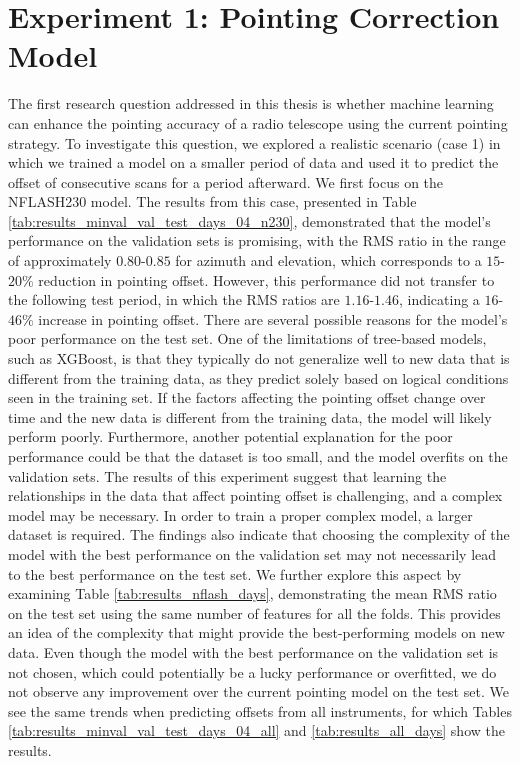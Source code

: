 \section{Experiment 1: Pointing Correction Model}
The first research question addressed in this thesis is whether machine learning can enhance the pointing accuracy of a radio telescope using the current pointing strategy.
To investigate this question, we explored a realistic scenario (case 1) in which we trained a model on a smaller period of data and used it to predict the offset of consecutive scans for a period afterward.
We first focus on the NFLASH230 model.
The results from this case, presented in Table \ref{tab:results_minval_val_test_days_04_n230}, demonstrated that the model's performance on the validation sets is promising,
with the RMS ratio in the range of approximately $0.80$-$0.85$ for azimuth and elevation,
which corresponds to a $15$-$20\%$ reduction in pointing offset.
However, this performance did not transfer to the following test period,
in which the RMS ratios are $1.16$-$1.46$, indicating a $16$-$46\%$ increase in pointing offset.
There are several possible reasons for the model's poor performance on the test set.
One of the limitations of tree-based models, such as XGBoost, is that they typically do not generalize well to new data that is different from the training data,
as they predict solely based on logical conditions seen in the training set.
If the factors affecting the pointing offset change over time and the new data is different from the training data, the model will likely perform poorly. 
Furthermore, another potential explanation for the poor performance could be that the dataset is too small, and the model overfits on the validation sets.
The results of this experiment suggest that learning the relationships in the data that affect pointing offset is challenging, and a complex model may be necessary.
In order to train a proper complex model, a larger dataset is required.
The findings also indicate that choosing the complexity of the model with the best performance on the validation set may not necessarily lead to the best performance on the test set.
We further explore this aspect by examining Table \ref{tab:results_nflash_days}, demonstrating the mean RMS ratio on the test set using the same number of features for all the folds.
This provides an idea of the complexity that might provide the best-performing models on new data.
Even though the model with the best performance on the validation set is not chosen, which could potentially be a lucky performance or overfitted,
we do not observe any improvement over the current pointing model on the test set.
We see the same trends when predicting offsets from all instruments, for which Tables \ref{tab:results_minval_val_test_days_04_all} and \ref{tab:results_all_days} show the results. \\


